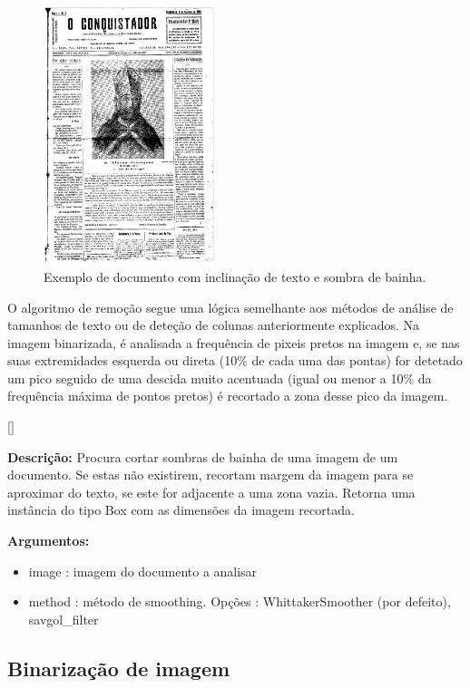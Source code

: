 \begin{figure}[H]
	\centering
	\includegraphics[width=5cm]{images/ilustracoes/document_margin_example.png}
	\caption{Exemplo de documento com inclinação de texto e sombra de bainha.}
	\label{fig:document_margin_example}
\end{figure}



O algoritmo de remoção segue uma lógica semelhante aos métodos de análise de tamanhos de texto ou de deteção de colunas anteriormente explicados. Na imagem binarizada, é analisada a frequência de pixeis pretos na imagem e, se nas suas extremidades esquerda ou direta (10\% de cada uma das pontas) for detetado um pico seguido de uma descida muito acentuada (igual ou menor a 10\% da frequência máxima de pontos pretos) é recortado a zona desse pico da imagem.

[\normalsize]

\textbf{Descrição:} Procura cortar sombras de bainha de uma imagem de um documento. Se estas não existirem, recortam margem da imagem para se aproximar do texto, se este for adjacente a uma zona vazia. Retorna uma instância do tipo Box com as dimensões da imagem recortada.

\textbf{Argumentos:}
\begin{itemize}\setlength\itemsep{-0.3em}
	\vspace{-0.5em}
	\item image : imagem do documento a analisar
	\item method : método de smoothing. Opções : WhittakerSmoother (por defeito), savgol\_filter
\end{itemize}


\subsection{Binarização de imagem}
\label{contribution_image_binarization}


